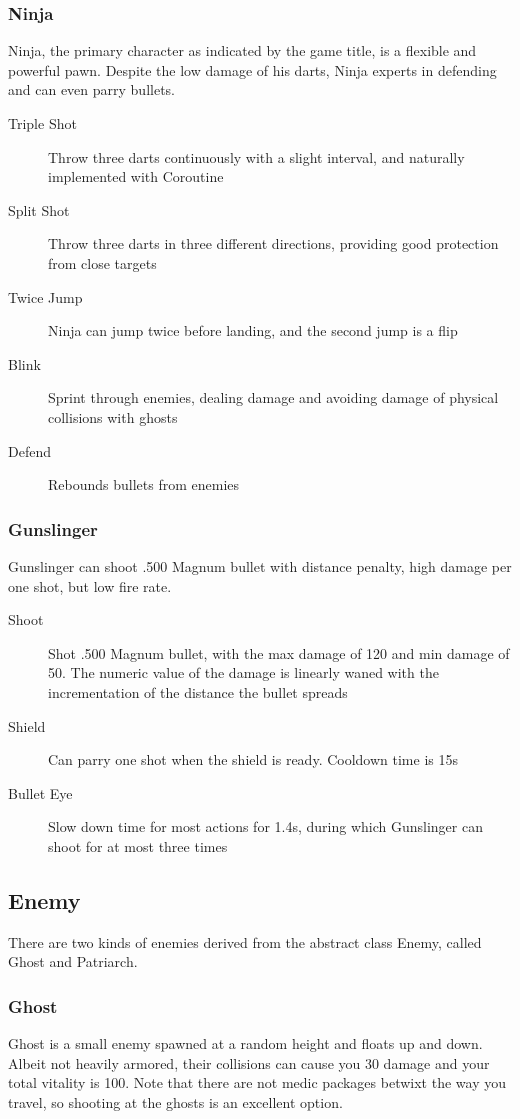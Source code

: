 \documentclass{article}
\begin{document}
\subsubsection{Ninja}
Ninja, the primary character as indicated by the game title, is a flexible and powerful pawn. Despite the low damage of his darts, Ninja experts in defending and can even parry bullets.
\begin{description}
\item[Triple Shot] Throw three darts continuously with a slight interval, and naturally implemented with Coroutine
\item[Split Shot] Throw three darts in three different directions, providing good protection from close targets
\item[Twice Jump] Ninja can jump twice before landing, and the second jump is a flip
\item[Blink] Sprint through enemies, dealing damage and avoiding damage of physical collisions with ghosts
\item[Defend] Rebounds bullets from enemies
\end{description}

\subsubsection{Gunslinger}
Gunslinger can shoot .500 Magnum bullet with distance penalty, high damage per one shot, but low fire rate.
\begin{description}
\item[Shoot] Shot .500 Magnum bullet, with the max damage of 120 and min damage of 50. The numeric value of the damage is linearly waned with the incrementation of the distance the bullet spreads
\item[Shield] Can parry one shot when the shield is ready. Cooldown time is 15s
\item[Bullet Eye] Slow down time for most actions for 1.4s, during which Gunslinger can shoot for at most three times
\end{description}


\subsection{Enemy}
There are two kinds of enemies derived from the abstract class Enemy, called Ghost and Patriarch.
\subsubsection{Ghost}
Ghost is a small enemy spawned at a random height and floats up and down. Albeit not heavily armored, their collisions can cause you 30 damage and your total vitality is 100. Note that there are not medic packages betwixt the way you travel, so shooting at the ghosts is an excellent option.
\end{document}
